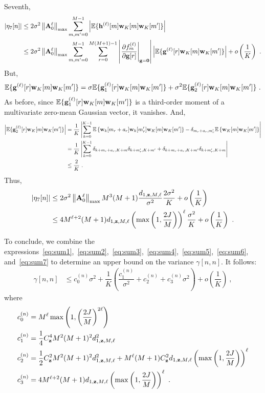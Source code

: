 \documentclass[journal,onecolumn]{IEEEtran}
\begin{document}
Seventh,
\begin{align*}
\left|\eta_7[n] \right| &\leq 2\sigma^2\left\|{\mathbf A}_0^{\ell}\right\|_{\max} \sum_{m,m'=0}^{M-1} \left| {\mathbb E}\{{\mathbf h}^{(\ell)}[m]{\mathbf w}_K[m]{\mathbf w}_K[m']\} \right| \\
&\leq 2\sigma^2\left\|{\mathbf A}_0^{\ell}\right\|_{\max} \sum_{m,m'=0}^{M-1} \sum_{r=0}^{M(M+1)-1}\left|\left.\dfrac{\partial f_m^{(\ell)}}{\partial {\mathbf g}[r]}\right\vert_{{\mathbf g}=\boldsymbol{0}}\right| \left| {\mathbb E}\{{\mathbf g}^{(\ell)}[r]{\mathbf w}_K[m]{\mathbf w}_K[m']\} \right| + o\left( \dfrac1K\right)\ .
\end{align*}
But,
\begin{align*}
{\mathbb E}\{{\mathbf g}^{(\ell)}[r]{\mathbf w}_K[m]{\mathbf w}_K[m']\} = \sigma{\mathbb E}\{{\mathbf g}_1^{(\ell)}[r]{\mathbf w}_K[m]{\mathbf w}_K[m']\} + \sigma^2{\mathbb E}\{{\mathbf g}_2^{(\ell)}[r]{\mathbf w}_K[m]{\mathbf w}_K[m']\}\ .
\end{align*}
As before, since ${\mathbb E}\{{\mathbf g}_1^{(\ell)}[r]{\mathbf w}_K[m]{\mathbf w}_K[m']\}$ is a third-order moment of a multivariate zero-mean Gaussian vector, it vanishes. And,
\begin{align*}
\left|{\mathbb E}\{{\mathbf g}_2^{(\ell)}[r]{\mathbf w}_K[m]{\mathbf w}_K[m']\}\right| &= \dfrac1K\left|\sum_{k=0}^{K-1} {\mathbb E}\left\{{\mathbf w}_{k}[m_{r}+a_{r}]{\mathbf w}_{k}[m'_{r}]{\mathbf w}_K[m]{\mathbf w}_K[m']\right\} - \delta_{m_r+a_r,m'_r} {\mathbb E}\left\{{\mathbf w}_K[m]{\mathbf w}_K[m']\right\}\right| \\
&= \dfrac1K\left|\sum_{k=0}^{K-1} \delta_{k+m_{r}+a_{r},K+m} \delta_{k+m'_{r},K+m'} +  \delta_{k+m_{r}+a_{r},K+m'} \delta_{k+m'_{r},K+m}\right| \\
&\leq \dfrac2K\ .
\end{align*}
Thus,
\begin{align}
\nonumber
\left| \eta_7[n] \right| &\leq 2\sigma^2\left\|\bA_0^{\ell}\right\|_{\max} M^3(M+1)\dfrac{d_{1,\bz,M,\ell}}{\sigma^2} \dfrac{2\sigma^2}K + o\left( \dfrac1K\right)\\
&\leq 4 M^{\ell+2}(M+1)d_{1,\bz,M,\ell}\left(\max\left(1,\frac{2J}{M}\right)\right)^\ell\dfrac{\sigma^2}{K} + o\left( \dfrac1K\right)\ .
\label{eq:sum7}
\end{align}

To conclude, we combine the expressions~\eqref{eq:sum1},~\eqref{eq:sum2},~\eqref{eq:sum3},~\eqref{eq:sum4},~\eqref{eq:sum5},~\eqref{eq:sum6}, and~\eqref{eq:sum7} to determine an upper bound on the variance $\gamma[n,n]$. It follows:
\begin{align*}
\gamma[n,n] &\leq c_0^{(n)}\sigma^2 + \dfrac{1}{K} \left( \dfrac{c_1^{(n)}}{\sigma^2} + c_2^{(n)} + c_3^{(n)}\sigma^2\right) + o\left(\dfrac1K\right)\ ,
\end{align*}
where
\begin{align*}
c_0^{(n)} & =  M^{\ell}\max\left(1,\left(\frac{2J}{M}\right)^{2\ell}\right) \\
c_1^{(n)} & = \dfrac14C_\bz^4 M^2(M+1)^2d_{1,\bz,M,\ell}^2  \\
c_2^{(n)} & = \dfrac12C_\bz^2 M^2(M+1)^2d_{1,\bz,M,\ell}^2 + M^\ell(M+1)C_\bz^2 d_{1,\bz,M,\ell}\left(\max\left(1,\frac{2J}{M}\right)\right)^\ell\\
c_3^{(n)} & =  4 M^{\ell+2}(M+1)d_{1,\bz,M,\ell}\left(\max\left(1,\frac{2J}{M}\right)\right)^\ell\ .
\end{align*}
\end{document}
